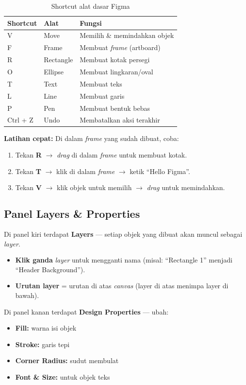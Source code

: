 \begin{table}[ht]
\centering
\caption{Shortcut alat dasar Figma}
\label{tab:m02-shortcut}
\begin{tabular}{llp{6cm}}
\toprule
\textbf{Shortcut} & \textbf{Alat} & \textbf{Fungsi} \\
\midrule
V & Move & Memilih \& memindahkan objek \\
F & Frame & Membuat \emph{frame} (artboard) \\
R & Rectangle & Membuat kotak persegi \\
O & Ellipse & Membuat lingkaran/oval \\
T & Text & Membuat teks \\
L & Line & Membuat garis \\
P & Pen & Membuat bentuk bebas \\
Ctrl + Z & Undo & Membatalkan aksi terakhir \\
\bottomrule
\end{tabular}
\end{table}

\textbf{Latihan cepat:} Di dalam \emph{frame} yang sudah dibuat, coba:
\begin{enumerate}
  \item Tekan \textbf{R} $\rightarrow$ \emph{drag} di dalam \emph{frame} untuk membuat kotak.
  \item Tekan \textbf{T} $\rightarrow$ klik di dalam \emph{frame} $\rightarrow$ ketik ``Hello Figma''.
  \item Tekan \textbf{V} $\rightarrow$ klik objek untuk memilih $\rightarrow$ \emph{drag} untuk memindahkan.
\end{enumerate}

\subsection{Panel Layers \& Properties}

Di panel kiri terdapat \textbf{Layers} --- setiap objek yang dibuat akan muncul sebagai \emph{layer}.

\begin{itemize}
  \item \textbf{Klik ganda} \emph{layer} untuk mengganti nama (misal: ``Rectangle 1'' menjadi ``Header Background'').
  \item \textbf{Urutan layer} = urutan di atas \emph{canvas} (layer di atas menimpa layer di bawah).
\end{itemize}

Di panel kanan terdapat \textbf{Design Properties} --- ubah:
\begin{itemize}
  \item \textbf{Fill:} warna isi objek
  \item \textbf{Stroke:} garis tepi
  \item \textbf{Corner Radius:} sudut membulat
  \item \textbf{Font \& Size:} untuk objek teks
\end{itemize}

